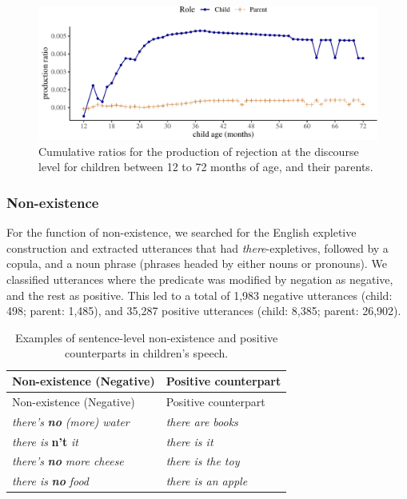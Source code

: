 \documentclass[
  man,floatsintext]{apa6}
\begin{document}
\begin{figure}[H]

{\centering \includegraphics{neg_construction_article_files/figure-latex/emotiondiscourse-1} 

}

\caption{Cumulative ratios for the production of rejection at the discourse level for children between 12 to 72 months of age, and their parents.}\label{fig:emotiondiscourse}
\end{figure}

\hypertarget{non-existence}{%
\subsubsection{Non-existence}\label{non-existence}}

For the function of non-existence, we searched for the English expletive construction and extracted utterances that had \emph{there}-expletives, followed by a copula, and a noun phrase (phrases headed by either nouns or pronouns). We classified utterances where the predicate was modified by negation as negative, and the rest as positive. This led to a total of 1,983 negative utterances (child: 498; parent: 1,485), and 35,287 positive utterances (child: 8,385; parent: 26,902).

\begin{longtable}[]{@{}ll@{}}
\caption{\label{tab:nonexist} Examples of sentence-level non-existence and positive counterparts in children's speech.}\tabularnewline
\toprule\noalign{}
Non-existence (Negative) & Positive counterpart \\
\midrule\noalign{}
\endfirsthead
\toprule\noalign{}
Non-existence (Negative) & Positive counterpart \\
\midrule\noalign{}
\endhead
\bottomrule\noalign{}
\endlastfoot
\emph{there's} \textbf{\emph{no}} \emph{(more) water} & \emph{there are books} \\
\emph{there is} \textbf{n't} \emph{it} & \emph{there is it} \\
\emph{there's} \textbf{\emph{no}} \emph{more cheese} & \emph{there is the toy} \\
\emph{there is} \textbf{\emph{no}} \emph{food} & \emph{there is an apple} \\
\end{longtable}
\end{document}
